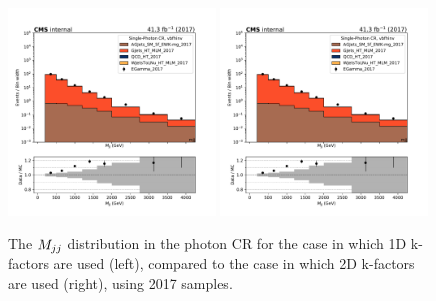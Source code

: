 \begin{figure}
    \begin{center}
        \includegraphics[width=0.49\textwidth]{fig/datamc/cr_g_vbf/cr_g_vbf_mjj_losf_2017.pdf}
        \includegraphics[width=0.49\textwidth]{fig/datamc_2dkfac/cr_g_vbf/cr_g_vbf_mjj_losf_2017.pdf} 
        \caption{The $M_{jj}$ distribution in the photon CR for the case in which 1D k-factors are used (left), 
        compared to the case in which 2D k-factors are used (right), using 2017 samples.}
        \label{fig:mjj_2017}
    \end{center}
\end{figure}

